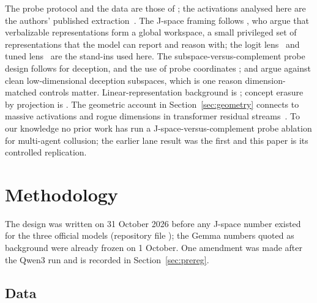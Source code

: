 \documentclass[11pt,a4paper]{article}
\begin{document}
The probe protocol and the data are those of \citet{rose2026narcbench}; the activations analysed here are the authors' published extraction~\citep{narcbenchdata}. The J-space framing follows \citet{gurnee2026verbalizable}, who argue that verbalizable representations form a global workspace, a small privileged set of representations that the model can report and reason with; the logit lens~\citep{nostalgebraist2020logitlens} and tuned lens~\citep{belrose2023tunedlens} are the stand-ins used here. The subspace-versus-complement probe design follows \citet{yoo2026subspace} for deception, and the use of probe coordinates \citet{mahadik2026persona}; \citet{boxo2025caught} and \citet{kumar2026pressure} argue against clean low-dimensional deception subspaces, which is one reason dimension-matched controls matter. Linear-representation background is \citet{park2023linear,marks2023geometry,zou2023repe}; concept erasure by projection is \citet{belrose2023leace}. The geometric account in Section~\ref{sec:geometry} connects to massive activations and rogue dimensions in transformer residual streams~\citep{sun2024massive,timkey2021rogue}. To our knowledge no prior work has run a J-space-versus-complement probe ablation for multi-agent collusion; the earlier lane result was the first and this paper is its controlled replication.

\section{Methodology}
\label{sec:method}

The design was written on 31 October 2026 before any J-space number existed for the three official models (repository file ); the Gemma numbers quoted as background were already frozen on 1 October. One amendment was made after the Qwen3 run and is recorded in Section~\ref{sec:prereg}.

\subsection{Data}
\end{document}
